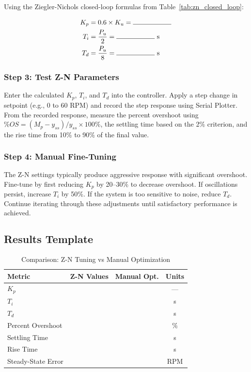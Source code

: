 Using the Ziegler-Nichols closed-loop formulas from Table~\ref{tab:zn_closed_loop}:

\begin{align}
    K_p &= 0.6 \times K_u = \rule{2cm}{0.4pt} \\
    T_i &= \frac{P_u}{2} = \rule{2cm}{0.4pt} \text{ s} \\
    T_d &= \frac{P_u}{8} = \rule{2cm}{0.4pt} \text{ s}
\end{align}

\subsubsection{Step 3: Test Z-N Parameters}

Enter the calculated $K_p$, $T_i$, and $T_d$ into the controller. Apply a step change in setpoint (e.g., 0 to 60 RPM) and record the step response using Serial Plotter. From the recorded response, measure the percent overshoot using $\%OS = (M_p - y_{ss})/y_{ss} \times 100\%$, the settling time based on the 2\% criterion, and the rise time from 10\% to 90\% of the final value.

\subsubsection{Step 4: Manual Fine-Tuning}

The Z-N settings typically produce aggressive response with significant overshoot. Fine-tune by first reducing $K_p$ by 20--30\% to decrease overshoot. If oscillations persist, increase $T_i$ by 50\%. If the system is too sensitive to noise, reduce $T_d$. Continue iterating through these adjustments until satisfactory performance is achieved.

\subsection{Results Template}

\begin{table}[htbp]
\centering
\caption{Comparison: Z-N Tuning vs Manual Optimization}
\label{tab:tuning_comparison}
\begin{tabular}{lccc}
\toprule
\textbf{Metric} & \textbf{Z-N Values} & \textbf{Manual Opt.} & \textbf{Units} \\
\midrule
$K_p$ & & & --- \\
$T_i$ & & & s \\
$T_d$ & & & s \\
\midrule
Percent Overshoot & & & \% \\
Settling Time & & & s \\
Rise Time & & & s \\
Steady-State Error & & & RPM \\
\bottomrule
\end{tabular}
\end{table}

